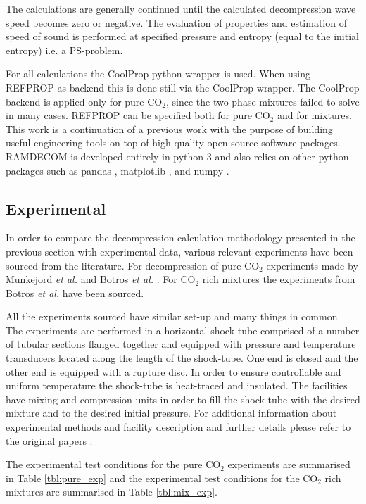\documentclass[a4paper, 10pt, twocolumn, twoside]{scrartcl}
\begin{document}
The calculations are generally continued until the calculated decompression wave speed becomes zero or negative. The evaluation of properties and estimation of speed of sound is performed at specified pressure and entropy (equal to the initial entropy) i.e. a PS-problem. 

For all calculations the CoolProp python wrapper is used. When using REFPROP as backend this is done still via the CoolProp wrapper. The CoolProp backend is applied only for pure CO$_2$, since the two-phase mixtures failed to solve in many cases. REFPROP can be specified both for pure CO$_2$ and for mixtures. This work is a continuation of a previous work \cite{Andreasen2021} with the purpose of building useful engineering tools on top of high quality open source software packages. RAMDECOM is developed entirely in python 3 and also relies on other python packages such as pandas \cite{mckinney-proc-scipy-2010}, matplotlib \cite{Hunter:2007}, and numpy \cite{harris2020array}. 



\subsection{Experimental}
In order to compare the decompression calculation methodology presented in the previous section with experimental data, various relevant experiments have been sourced from the literature. For decompression of pure CO$_2$ experiments made by Munkejord \emph{et al.} \cite{MUNKEJORD2020118560} and Botros \emph{et al.} \cite{Botros_pure}. For CO$_2$ rich mixtures the experiments from Botros \emph{et al.} \cite{Botros_mixture} have been sourced. 

All the experiments sourced have similar set-up and many things in common. The experiments are performed in a horizontal shock-tube comprised of a number of tubular sections flanged together and equipped with pressure and temperature transducers located along the length of the shock-tube. One end is closed and the other end is equipped with a rupture disc. In order to ensure controllable and uniform temperature the shock-tube is heat-traced and insulated. The facilities have mixing and compression units in order to fill the shock tube with the desired mixture and to the desired initial pressure. For additional information about experimental methods and facility description and further details please refer to the original papers \cite{MUNKEJORD2020118560,Botros_pure}.

The experimental test conditions for the pure CO$_2$ experiments are summarised in Table \ref{tbl:pure_exp} and the experimental test conditions for the CO$_2$ rich mixtures are summarised in Table \ref{tbl:mix_exp}.
\end{document}
